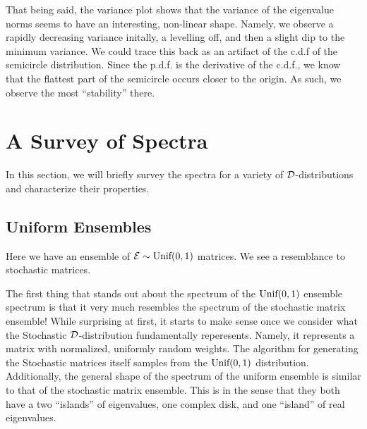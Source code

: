 That being said, the variance plot shows that the variance of the eigenvalue norms seems to have an interesting, non-linear shape. Namely, we observe a rapidly decreasing variance initally, a levelling off, and then a slight dip to the minimum variance. We could trace this back as an artifact of the c.d.f of the semicircle distribution. Since the p.d.f. is the derivative of the c.d.f., we know that the flattest part of the semicircle occurs closer to the origin. As such, we observe the most ``stability'' there.

\trim
{}%

\newpage
\section{A Survey of Spectra}

In this section, we will briefly survey the spectra for a variety of $\mathcal{D}$-distributions and characterize their properties.

\subsection{Uniform Ensembles}
Here we have an ensemble of $\mathcal{E} \sim \text{Unif}(0,1)$ matrices. We see a resemblance to
stochastic matrices.

\vspace{-1em}
\vspace{-2em}

The first thing that stands out about the spectrum of the $\text{Unif}(0,1)$ ensemble spectrum is that it very much resembles the spectrum of the stochastic matrix ensemble!
While surprising at first, it starts to make sense once we consider what the Stochastic $\mathcal{D}$-distribution fundamentally reperesents. Namely, it represents a matrix with normalized, uniformly random weights. The algorithm for generating the Stochastic matrices itself samples from the $\text{Unif}(0,1)$ distribution. Additionally, the general shape of the spectrum of the uniform ensemble is similar to that of the stochastic matrix ensemble. This is in the sense that they both have a two ``islands'' of eigenvalues, one complex disk, and one ``island'' of real eigenvalues. \newline

